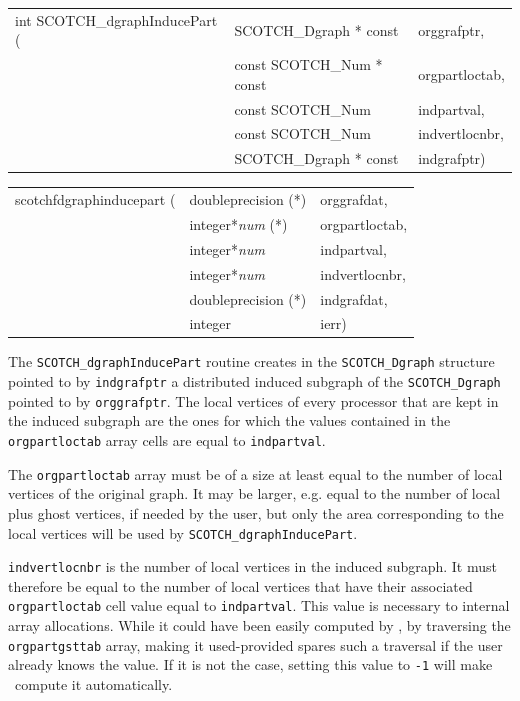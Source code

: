 \begin{itemize}
\progsyn

{\tt\begin{tabular}{l@{}ll}
int SCOTCH\_dgraphInducePart ( & SCOTCH\_Dgraph * const    & orggrafptr,    \\
                               & const SCOTCH\_Num * const & orgpartloctab, \\
                               & const SCOTCH\_Num         & indpartval,    \\
                               & const SCOTCH\_Num         & indvertlocnbr, \\
                               & SCOTCH\_Dgraph * const    & indgrafptr)
\end{tabular}}

{\tt\begin{tabular}{l@{}ll}
scotchfdgraphinducepart ( & doubleprecision (*)   & orggrafdat,    \\
                          & integer*{\it num} (*) & orgpartloctab, \\
                          & integer*{\it num}     & indpartval,    \\
                          & integer*{\it num}     & indvertlocnbr, \\
                          & doubleprecision (*)   & indgrafdat,    \\
                          & integer               & ierr)
\end{tabular}}

\progdes

The {\tt SCOTCH\_dgraphInducePart} routine creates in the
{\tt SCOTCH\_\lbt Dgraph} structure pointed to by {\tt indgrafptr}
a distributed induced subgraph of the {\tt SCOTCH\_\lbt Dgraph}
pointed to by {\tt orggrafptr}. The local vertices of every processor
that are kept in the induced subgraph are the ones for which the
values contained in the {\tt orgpart\lbt loctab} array cells are equal
to {\tt indpartval}.

The {\tt orgpartloctab} array must be of a size at least equal to
the number of local vertices of the original graph. It may be larger,
e.g. equal to the number of local plus ghost vertices, if needed by
the user, but only the area corresponding to the local vertices will
be used by {\tt SCOTCH\_\lbt dgraph\lbt Induce\lbt Part}.

{\tt indvertlocnbr} is the number of local vertices in the induced
subgraph. It must therefore be equal to the number of local vertices
that have their associated {\tt org\lbt part\lbt loc\lbt tab} cell
value equal to {\tt indpartval}. This value is necessary to internal
array allocations. While it could have been easily computed by
\scotch, by traversing the {\tt orgpart\lbt gsttab} array, making it
used-provided spares such a traversal if the user already knows the
value. If it is not the case, setting this value to {\tt -1} will make
\scotch\ compute it automatically.


\end{itemize}
